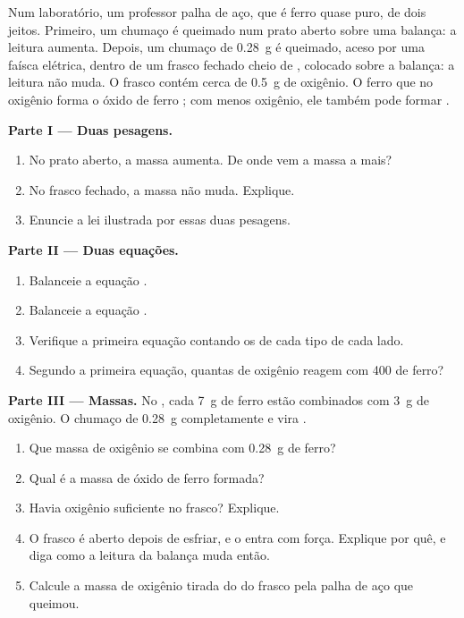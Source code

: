 \begin{problem}
\label{pb:g8:balanced-equations:1}
Num laboratório, um professor  palha de aço, que é ferro quase
puro, de dois jeitos. Primeiro, um chumaço é queimado num prato aberto
sobre uma balança: a leitura aumenta. Depois, um chumaço de
\qty{0.28}{g} é queimado, aceso por uma faísca elétrica, dentro de um
frasco fechado cheio de , colocado sobre a balança: a leitura não
muda. O frasco contém cerca de \qty{0.5}{g} de oxigênio. O ferro que
 no oxigênio forma o óxido de ferro ; com menos oxigênio,
ele também pode formar .

\medskip
\noindent\textbf{Parte I --- Duas pesagens.}
\begin{enumerate}
  \item No prato aberto, a massa aumenta. De onde vem a massa a mais?
  \item No frasco fechado, a massa não muda. Explique.
  \item Enuncie a lei ilustrada por essas duas pesagens.
\end{enumerate}

\medskip
\noindent\textbf{Parte II --- Duas equações.}
\begin{enumerate}[resume]
  \item Balanceie a equação . %
  \item Balanceie a equação . %
  \item Verifique a primeira equação contando os  de cada tipo de
        cada lado.
  \item Segundo a primeira equação, quantas  de oxigênio reagem
        com 400  de ferro?
\end{enumerate}

\medskip
\noindent\textbf{Parte III --- Massas.}
No , cada \qty{7}{g} de ferro estão combinados com \qty{3}{g}
de oxigênio. O chumaço de \qty{0.28}{g}  completamente e vira
.
\begin{enumerate}[resume]
  \item Que massa de oxigênio se combina com \qty{0.28}{g} de ferro?
  \item Qual é a massa de óxido de ferro formada?
  \item Havia oxigênio suficiente no frasco? Explique.
  \item O frasco é aberto depois de esfriar, e o  entra com força.
        Explique por quê, e diga como a leitura da balança muda então.
  \item Calcule a massa de oxigênio tirada do  do frasco pela palha de
        aço que queimou.
\end{enumerate}
\end{problem}

